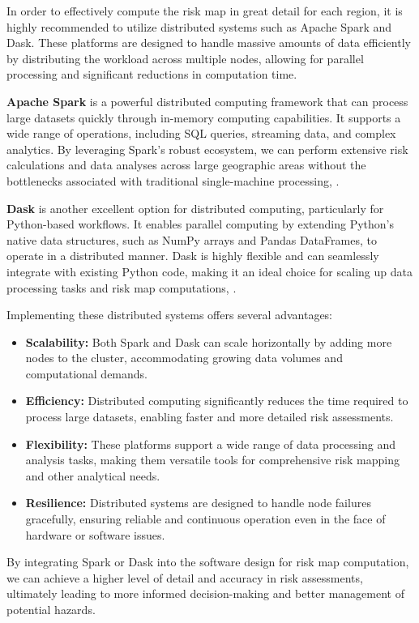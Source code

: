 \documentclass[12pt]{report}
\begin{document}
        In order to effectively compute the risk map in great detail for each region, it is highly recommended to
        utilize distributed systems such as Apache Spark and Dask. These platforms are designed to handle massive
        amounts of data efficiently by distributing the workload across multiple nodes, allowing for parallel processing
        and significant reductions in computation time.

        
        \textbf{Apache Spark} is a powerful distributed computing framework that can process large datasets quickly
        through in-memory computing capabilities. It supports a wide range of operations, including SQL queries,
        streaming data, and complex analytics. By leveraging Spark's robust ecosystem, we can perform extensive risk
        calculations and data analyses across large geographic areas without the bottlenecks associated with traditional
        single-machine processing, \cite{the_apache_software_foundation_sparkr_2024}.
        
        \textbf{Dask} is another excellent option for distributed computing, particularly for Python-based workflows. It
        enables parallel computing by extending Python's native data structures, such as NumPy arrays and Pandas
        DataFrames, to operate in a distributed manner. Dask is highly flexible and can seamlessly integrate with
        existing Python code, making it an ideal choice for scaling up data processing tasks and risk map computations, 
        \cite{dask_development_team_dask_2016}.
        
        Implementing these distributed systems offers several advantages:
        \begin{itemize}
          \item \textbf{Scalability:} Both Spark and Dask can scale horizontally by adding more nodes to the cluster,
          accommodating growing data volumes and computational demands.
          \item \textbf{Efficiency:} Distributed computing significantly reduces the time required to process large
          datasets, enabling faster and more detailed risk assessments.
          \item \textbf{Flexibility:} These platforms support a wide range of data processing and analysis tasks, making
          them versatile tools for comprehensive risk mapping and other analytical needs.
          \item \textbf{Resilience:} Distributed systems are designed to handle node failures gracefully, ensuring
          reliable and continuous operation even in the face of hardware or software issues.
        \end{itemize}
        
        By integrating Spark or Dask into the software design for risk map computation, we can achieve a higher level of
        detail and accuracy in risk assessments, ultimately leading to more informed decision-making and better
        management of potential hazards.


\printbibliography
\end{document}
